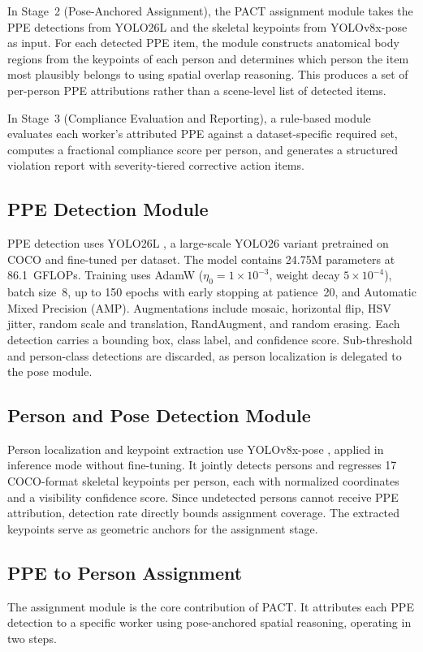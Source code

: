 \documentclass[conference]{IEEEtran}
\begin{document}
In Stage~2 (Pose-Anchored Assignment), the PACT assignment module takes the PPE detections from YOLO26L and the skeletal keypoints from YOLOv8x-pose as input. For each detected PPE item, the module constructs anatomical body regions from the keypoints of each person and determines which person the item most plausibly belongs to using spatial overlap reasoning. This produces a set of per-person PPE attributions rather than a scene-level list of detected items.

In Stage~3 (Compliance Evaluation and Reporting), a rule-based module evaluates each worker's attributed PPE against a dataset-specific required set, computes a fractional compliance score per person, and generates a structured violation report with severity-tiered corrective action items.


\subsection{PPE Detection Module}
PPE detection uses YOLO26L \cite{sapkota_yolo26_2026}, a large-scale YOLO26 variant pretrained on COCO and fine-tuned per dataset. The model contains 24.75M parameters at 86.1~GFLOPs. Training uses AdamW ($\eta_0 = 1{\times}10^{-3}$, weight decay $5{\times}10^{-4}$), batch size~8, up to 150 epochs with early stopping at patience~20, and Automatic Mixed Precision (AMP). Augmentations include mosaic, horizontal flip, HSV jitter, random scale and translation, RandAugment, and random erasing. Each detection carries a bounding box, class label, and confidence score. Sub-threshold and person-class detections are discarded, as person localization is delegated to the pose module.


\subsection{Person and Pose Detection Module}
Person localization and keypoint extraction use YOLOv8x-pose \cite{yaseen_what_2024}, applied in inference mode without fine-tuning. It jointly detects persons and regresses 17 COCO-format skeletal keypoints per person, each with normalized coordinates and a visibility confidence score. Since undetected persons cannot receive PPE attribution, detection rate directly bounds assignment coverage. The extracted keypoints serve as geometric anchors for the assignment stage.


\subsection{PPE to Person Assignment}
The assignment module is the core contribution of PACT. It attributes each PPE detection to a specific worker using pose-anchored spatial reasoning, operating in two steps.
\end{document}

